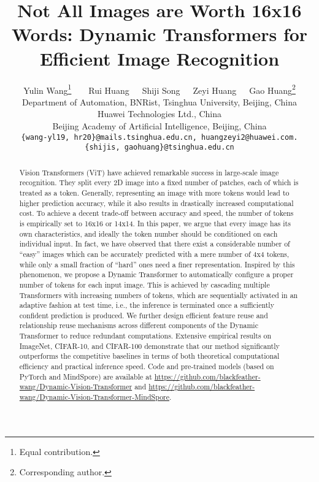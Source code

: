 \documentclass{article}
\title{Not All Images are Worth 16x16 Words: Dynamic Transformers for Efficient Image Recognition}
\author{Yulin Wang\thanks{Equal contribution.}\ \ \ \ 
  Rui Huang\ \ \ 
  Shiji Song\ \ \ 
  Zeyi Huang\ \ \ 
  Gao Huang\thanks{Corresponding author.}\\
    Department of Automation, BNRist, Tsinghua University, Beijing, China\\
Huawei Technologies Ltd., China\\
    Beijing Academy of Artificial Intelligence, Beijing, China\\
  \texttt{\{wang-yl19, hr20\}@mails.tsinghua.edu.cn, huangzeyi2@huawei.com.} \\
  \texttt{\{shijis, gaohuang\}@tsinghua.edu.cn}
}
\begin{document}
\maketitle

\begin{abstract}

Vision Transformers (ViT) have achieved remarkable success in large-scale image recognition. They split every 2D image into a fixed number of patches, each of which is treated as a token. Generally, representing an image with more tokens would lead to higher prediction accuracy, while it also results in drastically increased computational cost. To achieve a decent trade-off between accuracy and speed, the number of tokens is empirically set to 16x16 or 14x14. In this paper, we argue that every image has its own characteristics, and ideally the token number should be conditioned on each individual input. In fact, we have observed that there exist a considerable number of ``easy'' images which can be accurately predicted with a mere number of 4x4 tokens, while only a small fraction of ``hard'' ones need a finer representation. Inspired by this phenomenon, we propose a Dynamic Transformer to automatically configure a proper number of tokens for each input image. This is achieved by cascading multiple Transformers with increasing numbers of tokens, which are sequentially activated in an adaptive fashion at test time, i.e., the inference is terminated once a sufficiently confident prediction is produced. We further design efficient feature reuse and relationship reuse mechanisms across different components of the Dynamic Transformer to reduce redundant computations. Extensive empirical results on ImageNet, CIFAR-10, and CIFAR-100 demonstrate that our method significantly outperforms the competitive baselines in terms of both theoretical computational efficiency and practical inference speed. Code and pre-trained models (based on PyTorch and MindSpore) are available at \url{https://github.com/blackfeather-wang/Dynamic-Vision-Transformer} and \url{https://github.com/blackfeather-wang/Dynamic-Vision-Transformer-MindSpore}.



\end{abstract}
\end{document}
